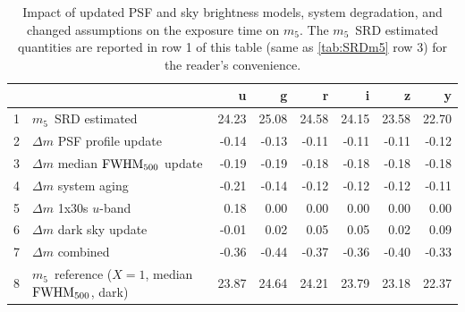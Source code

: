 \documentclass[PST,authoryear,toc]{lsstdoc}
\newcommand{\cm}{\ensuremath{C_m}}
\newcommand{\mf}{\ensuremath{m_5}}
\begin{document}
 \begin{table}[h!]
\caption{Impact of updated PSF and sky brightness models, system degradation, and changed assumptions on the exposure time on \mf. The \mf\ SRD estimated quantities are reported in  row 1 of this table (same as \autoref{tab:SRDm5} row 3) for the reader's convenience.}\label{tab:bl1}
\vskip 0.05in
    \centering
\begin{tabular}{llrrrrrr}
\hline
{} &{}&      u &      g &      r &      i &      z &      y \\
\hline
1& \mf\ SRD estimated                    &  24.23 &  25.08 &  24.58 &  24.15 &  23.58 &  22.70 \\
\hline
\hline
2& $\Delta m$ PSF profile update    &   -0.14 &   -0.13 &   -0.11 &   -0.11 &   -0.11 &   -0.12 \\
3& $\Delta m$ median ${\rm FWHM}_{500}$ update &   -0.19 &   -0.19 &   -0.18 &   -0.18 &   -0.18 &   -0.18 \\
4& $\Delta m$ system aging         &   -0.21 &   -0.14 &   -0.12 &   -0.12 &   -0.12 &   -0.11 \\
5&$\Delta m$ 1x30s $u$-band          &  0.18 &   0.00 &   0.00 &   0.00 &   0.00 &   0.00 \\
6& $\Delta m$ dark sky update       &   -0.01 &  0.02 &  0.05 &  0.05 &  0.02 &  0.09 \\
\hline
7& $\Delta m$ combined              &   -0.36 &   -0.44 &   -0.37 &   -0.36 &   -0.40 &   -0.33 \\
\hline
\hline
8& \mf\ reference   ($X=1$, median ${\rm FWHM}_{500}$, dark)        &  23.87 &  24.64 &  24.21 &  23.79 &  23.18 &  22.37 \\
\hline
\end{tabular}
\end{table}

 \FloatBarrier


\end{document}
